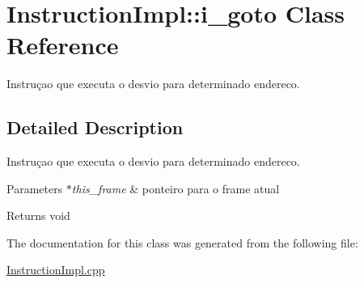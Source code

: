 \hypertarget{class_instruction_impl_1_1i__goto}{}\section{Instruction\+Impl\+:\+:i\+\_\+goto Class Reference}
\label{class_instruction_impl_1_1i__goto}


Instruçao que executa o desvio para determinado endereco.  




\subsection{Detailed Description}
Instruçao que executa o desvio para determinado endereco. 


\begin{DoxyParams}{Parameters}
{\em $\ast$this\+\_\+frame} & ponteiro para o frame atual \\
\hline
\end{DoxyParams}
\begin{DoxyReturn}{Returns}
void 
\end{DoxyReturn}


The documentation for this class was generated from the following file\+:\begin{DoxyCompactItemize}
\item 
\hyperlink{_instruction_impl_8cpp}{Instruction\+Impl.\+cpp}\end{DoxyCompactItemize}
